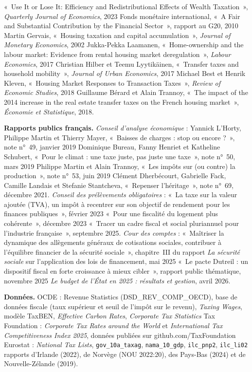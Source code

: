 \documentclass[11pt,a4paper]{article}
\begin{document}
{«~Use It or Lose It: Efficiency and Redistributional Effects of Wealth Taxation~», \emph{Quarterly
Journal of Economics}, 2023 \textbullet{} Fonds monétaire international, «~A Fair and Substantial
Contribution by the Financial Sector~», rapport au G20, 2010 \textbullet{} Martin Gervais, «~Housing
taxation and capital accumulation~», \emph{Journal of Monetary Economics}, 2002 \textbullet{}
Jukka-Pekka Laamanen, «~Home-ownership and the labour market: Evidence from rental housing market
deregulation~», \emph{Labour Economics}, 2017 \textbullet{} Christian Hilber et
Teemu Lyytikäinen, «~Transfer taxes and household mobility~», \emph{Journal of Urban Economics},
2017 \textbullet{} Michael Best et Henrik Kleven, «~Housing Market Responses to Transaction Taxes~»,
\emph{Review of Economic Studies}, 2018 \textbullet{} Guillaume Bérard et Alain Trannoy, «~The
impact of the 2014 increase in the real estate transfer taxes on the French housing market~»,
\emph{Économie et Statistique}, 2018.

\textbf{Rapports publics français.} \emph{Conseil d'analyse économique} : Yannick L'Horty, Philippe
Martin et Thierry Mayer, «~Baisses de charges : stop ou encore ?~», note n°~49, janvier 2019
\textbullet{} Dominique Bureau, Fanny Henriet et Katheline Schubert, «~Pour le climat : une taxe
juste, pas juste une taxe~», note n°~50, mars 2019 \textbullet{} Philippe Martin et Alain Trannoy,
«~Les impôts sur (ou contre) la production~», note n°~53, juin 2019 \textbullet{} Clément
Dherbécourt, Gabrielle Fack, Camille Landais et Stefanie Stantcheva, «~Repenser l'héritage~», note
n°~69, décembre 2021. \emph{Conseil des prélèvements obligatoires} : «~La taxe sur la valeur ajoutée
(TVA), un impôt à recentrer sur son objectif de rendement pour les finances publiques~», février
2023 \textbullet{} «~Pour une fiscalité du logement plus cohérente~», décembre 2023
\textbullet{} «~Tracer un cadre fiscal et social pluriannuel pour l'industrie française~», septembre
2025. \emph{Cour des comptes} : «~Maîtriser la dynamique des allègements généraux de cotisations
sociales, contribuer à l'équilibre financier de la sécurité sociale~», chapitre~III du rapport
\emph{La sécurité sociale} sur l'application des lois de financement, mai 2025 \textbullet{} «~Le
pacte Dutreil : un dispositif fiscal en forte croissance à mieux cibler~», rapport public
thématique, novembre 2025 \textbullet{} \emph{Le budget de l'État en 2025 : résultats et gestion},
avril 2026.

\textbf{Données.} OCDE : Revenue Statistics (DSD\_REV\_COMP\_OECD), base de données fiscale (taux
supérieur et seuil de l'impôt sur le revenu), \emph{Taxing Wages}, modèle TaxBEN, \emph{Effective
Carbon Rates}, \emph{Corporate Tax Statistics} \textbullet{} Tax Foundation : \emph{Corporate Tax
Rates around the World} et \emph{International Tax Competitiveness Index 2025}, données publiées sur
github.com/TaxFoundation \textbullet{} Eurostat : \emph{National Tax Lists}, \texttt{gov\_10a\_taxag},
\texttt{nama\_10\_gdp}, \texttt{ilc\_pnp2}, \texttt{ilc\_li02} \textbullet{} rapports d'Irlande
(2022), de Norvège (NOU 2022:20), des Pays-Bas (2024) et de Nouvelle-Zélande (2019).

}
\end{document}
